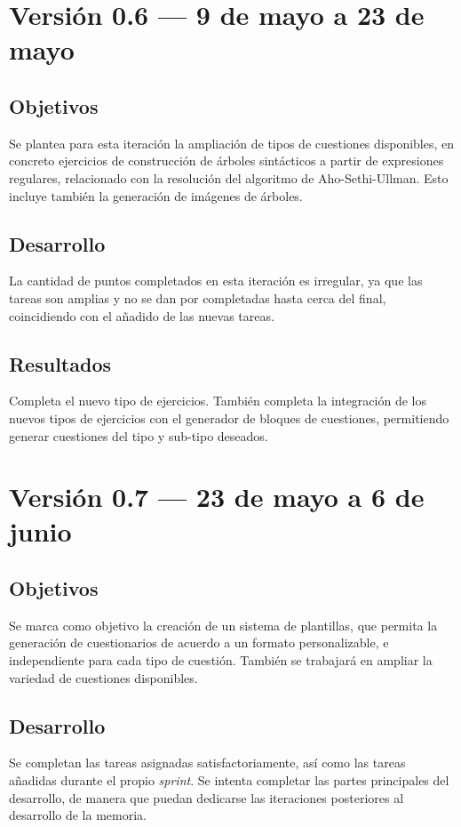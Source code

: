 \section{Versión 0.6 --- 9 de mayo a 23 de mayo}
\subsection{Objetivos}
Se plantea para esta iteración la ampliación de tipos de cuestiones disponibles, en concreto ejercicios de construcción de árboles sintácticos a partir de expresiones regulares, relacionado con la resolución del algoritmo de Aho-Sethi-Ullman.
Esto incluye también la generación de imágenes de árboles.

\subsection{Desarrollo}
La cantidad de puntos completados en esta iteración es irregular, ya que las tareas son amplias y no se dan por completadas hasta cerca del final, coincidiendo con el añadido de las nuevas tareas.


\subsection{Resultados}
Completa el nuevo tipo de ejercicios.
También completa la integración de los nuevos tipos de ejercicios con el generador de bloques de cuestiones, permitiendo generar cuestiones del tipo y sub-tipo deseados.

\section{Versión 0.7 --- 23 de mayo a 6 de junio}
\subsection{Objetivos}
Se marca como objetivo la creación de un sistema de plantillas, que permita la generación de cuestionarios de acuerdo a un formato personalizable, e independiente para cada tipo de cuestión.
También se trabajará en ampliar la variedad de cuestiones disponibles.

\subsection{Desarrollo}
Se completan las tareas asignadas satisfactoriamente, así como las tareas añadidas durante el propio \emph{sprint}.
Se intenta completar las partes principales del desarrollo, de manera que puedan dedicarse las iteraciones posteriores al desarrollo de la memoria.

